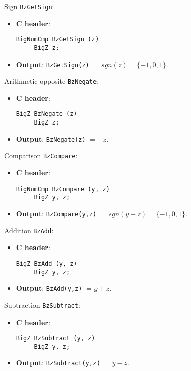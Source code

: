 \begin{func} Sign  \verb+BzGetSign+:
\begin{itemize}
  \item{\bf C header}:
\begin{verbatim}
BigNumCmp BzGetSign (z) 
     BigZ z;
\end{verbatim}
  \item{\bf Output}: \verb+BzGetSign(z)+ $= sgn(z) = \{ -1,0,1 \}$.
\end{itemize}
\end{func}
 
 
\begin{func} Arithmetic opposite  \verb+BzNegate+:
\begin{itemize}
  \item{\bf C header}:
\begin{verbatim}
BigZ BzNegate (z)       
     BigZ z;
\end{verbatim}
  \item{\bf Output}: \verb+BzNegate(z)+ $= -z  $.
\end{itemize}
\end{func}
 
 
\begin{func} Comparison  \verb+BzCompare+:
\begin{itemize}
  \item{\bf C header}:
\begin{verbatim}
BigNumCmp BzCompare (y, z)
     BigZ y, z;
\end{verbatim}
  \item{\bf Output}: \verb+BzCompare(y,z)+ $= sgn(y-z) = \{ -1,0,1 \}$.
\end{itemize}
\end{func}
 
 
\begin{func} Addition  \verb+BzAdd+:
\begin{itemize}
  \item{\bf C header}:
\begin{verbatim}
BigZ BzAdd (y, z)       
     BigZ y, z;
\end{verbatim}
  \item{\bf Output}: \verb+BzAdd(y,z)+ $= y+z  $.
\end{itemize}
\end{func}
 
 
\begin{func}  Subtraction \verb+BzSubtract+:
\begin{itemize}
  \item{\bf C header}:
\begin{verbatim}
BigZ BzSubtract (y, z)  
     BigZ y, z;
\end{verbatim}
  \item{\bf Output}: \verb+BzSubtract(y,z)+ $= y-z   $.
\end{itemize}
\end{func}
 
